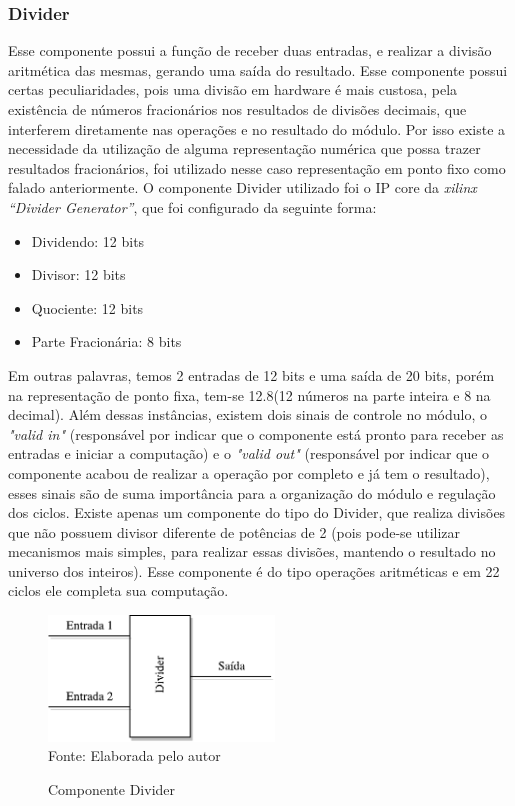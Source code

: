 \subsubsection{Divider}
Esse componente possui a função de receber duas entradas, e realizar a divisão aritmética das mesmas, gerando uma saída do resultado. Esse componente possui certas peculiaridades, pois uma divisão em hardware é mais custosa, pela existência de números fracionários nos resultados de divisões decimais, que interferem diretamente nas operações e no resultado do módulo. Por isso existe a necessidade da utilização de alguma representação numérica que possa trazer resultados fracionários, foi utilizado nesse caso representação em ponto fixo como falado anteriormente. O componente Divider utilizado foi o IP core da \textit{xilinx “Divider Generator”}, que foi configurado da seguinte forma: 
\begin{itemize}
	\item 	Dividendo: 12 bits
	\item 	Divisor: 12 bits
	\item 	Quociente: 12 bits
	\item 	Parte Fracionária: 8 bits
\end{itemize}
Em outras palavras, temos 2 entradas de 12 bits e uma saída de 20 bits, porém na representação de ponto fixa, tem-se 12.8(12 números na parte inteira e 8 na decimal). Além dessas instâncias, existem dois sinais de controle no módulo, o \textit{"valid in"} (responsável por indicar que o componente está pronto para receber as entradas e iniciar a computação) e o \textit{"valid out"} (responsável por indicar que o componente acabou de realizar a operação por completo e já tem o resultado), esses sinais são de suma importância para a organização do módulo e regulação dos ciclos. Existe apenas um componente do tipo do Divider, que realiza divisões que não possuem divisor diferente de potências de 2 (pois pode-se utilizar mecanismos mais simples, para realizar essas divisões, mantendo o resultado no universo dos inteiros).  Esse componente é do tipo operações aritméticas e em 22 ciclos ele completa sua computação.

\begin{figure}[H]
	\centering
	\caption{Componente Divider}
	\includegraphics[width=6cm]{figures/Divider.pdf}\\
	
	{Fonte: Elaborada pelo autor}
	\label{divider}
\end{figure}

